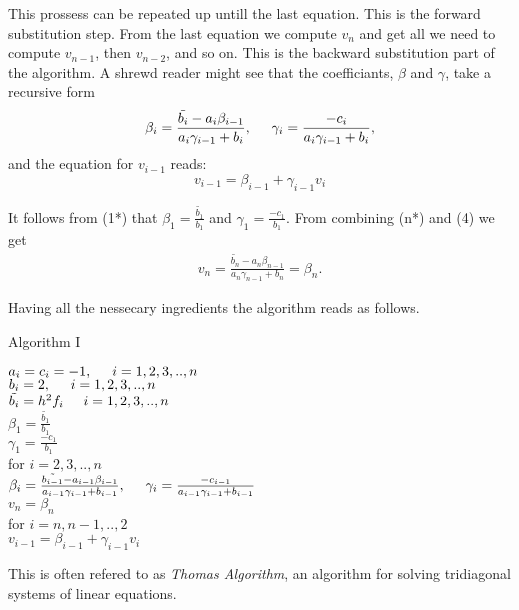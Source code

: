 \documentclass[11pt,a4paper,english]{article}
\begin{document}
This prossess can be repeated up untill the last equation. This is the forward substitution step. From the last equation we compute $v_n$ and get all we need to compute $v_{n-1}$, then $v_{n-2}$, and so on. This is the backward substitution part of the algorithm. A shrewd reader might see that the coefficiants, $\beta$ and $\gamma$, take a recursive form
\begin{align*}
\beta_{i} = \frac{\tilde{b_i}-a_i \beta_{i-1}}{a_i \gamma_{i-1} + b_i} , \hspace{0.5cm} \gamma_{i}=\frac{-c_i}{a_i \gamma_{i-1} + b_i},
\end{align*}
and the equation for $v_{i-1}$ reads: 
\begin{equation}
v_{i-1} = \beta_{i-1} + \gamma_{i-1} v_i
\end{equation}

It follows from (1*) that $\beta_1 = \frac{\tilde{b_1}}{b_1}$ and $\gamma_1 = \frac{-c_1}{b_1}$.
From combining (n*) and (4) we get 
\begin{align*}
v_n = \frac{\tilde{b_n}-a_n \beta_{n-1}}{a_n \gamma_{n-1} + b_n} = \beta_{n}.
\end{align*}

Having all the nessecary ingredients the algorithm reads as follows.
\vspace{0.5cm}\\
\centerline{Algorithm I}
\begin{tcolorbox}
$a_i = c_i = -1, \hspace{0.5cm}  i=1,2,3,..,n$ \\
$b_i = 2, \hspace{0.5cm}  i=1,2,3,..,n $\\
$\tilde{b_i} = h^2 f_i \hspace{0.5cm}  i=1,2,3,..,n $ \\
$\beta_1 = \frac{\tilde{b_1}}{b_1}$ \\
$\gamma_1 = \frac{-c_1}{b_1}$ \\
for $i=2,3,..,n$ \\ \vspace{0.5cm} 
 \hspace{0.5cm} $ \beta_{i} = \frac{\tilde{b_{i-1}}-a_{i-1} \beta_{i-1}}{a_{i-1} \gamma_{i-1} + b_{i-1}} , \hspace{0.5cm} \gamma_{i}=\frac{-c_{i-1}}{a_{i-1} \gamma_{i-1} + b_{i-1}} $ \vspace{0.2cm}  \\
 $v_{n} = \beta_{n}$ \\
for $i=n, n-1,..,2$ \\ \vspace{0.5cm} 
 \hspace{0.5cm} $v_{i-1} = \beta_{i-1} + \gamma_{i-1} v_i$

\end{tcolorbox} 


This is often refered to as \emph{Thomas Algorithm}, an algorithm for solving tridiagonal systems of linear equations.
\end{document}
